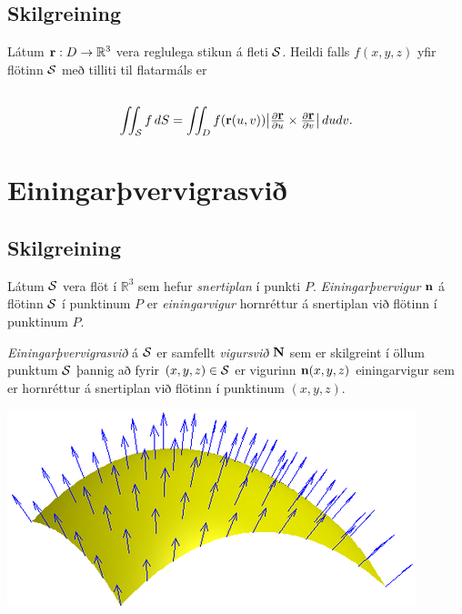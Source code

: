 \documentclass[a4paper,10pt,icelandic]{sphinxmanual}
\begin{document}
\subsection{Skilgreining}
\label{Kafli5:id22}
Látum \(\mbox{${\bf r}$}: D\rightarrow {\mathbb  R}^3\) vera
reglulega stikun á fleti \(\cal S\). Heildi falls \(f(x,y,z)\)
yfir flötinn \(\cal S\) með tilliti til flatarmáls er
\begin{gather}
\begin{split}\displaystyle\end{split}\notag\\\begin{split}\int\!\!\!\int_{\cal S} f\,dS=\int\!\!\!\int_D f(\mbox{${\bf r}$}(u,v)) \big|{\textstyle\frac{\partial
    \mbox{${\bf r}$}}{\partial u}
\times\frac{\partial \mbox{${\bf r}$}}{\partial v}}\big|\,dudv.\end{split}\notag
\end{gather}

\section{Einingarþvervigrasvið}
\label{Kafli5:index-8}\label{Kafli5:einingarvervigrasvi}

\subsection{Skilgreining}
\label{Kafli5:id23}
Látum \(\cal S\) vera flöt í \({\mathbb  R}^3\) sem hefur \textit{snertiplan} í punkti \(P\).
\emph{Einingarþvervigur} \(\mbox{${\bf n}$}\) á flötinn \(\cal S\) í
punktinum \(P\) er \textit{einingarvigur} hornréttur á snertiplan við flötinn
í punktinum \(P\).

\emph{Einingarþvervigrasvið} á \(\cal S\) er samfellt \textit{vigursvið}
\(\mbox{${\bf N}$}\) sem er skilgreint í öllum punktum
\(\cal S\) þannig að fyrir \((x,y,z)\in{\cal S}\) er vigurinn
\(\mbox{${\bf n}$}(x,y,z)\) einingarvigur sem er hornréttur á
snertiplan við flötinn í punktinum \((x,y,z)\).

{\hfill\includegraphics[width=0.500\linewidth]{normalfield.png}\hfill}
\end{document}
